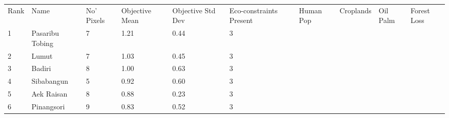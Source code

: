 \begin{table}[ht]
\centering
\begingroup\fontsize{9pt}{10pt}\selectfont
\begin{tabular}{C{0.05\textwidth}C{0.15\textwidth}C{0.08\textwidth}C{0.08\textwidth}C{0.08\textwidth}C{0.08\textwidth}C{0.08\textwidth}C{0.08\textwidth}C{0.08\textwidth}C{0.08\textwidth}}
 Rank & Name & No' Pixels & Objective Mean & Objective Std Dev & Eco-constraints  Present & Human Pop & Croplands & Oil Palm & Forest Loss \\ 
 {1} & Pasaribu Tobing &   7 & \textcolor[HTML]{FFFFFF}{1.21} & \textcolor[HTML]{000000}{0.44} & \textcolor[HTML]{FFFFFF}{3} &  &  &  &  \\ 
  {2} & Lumut &   7 & \textcolor[HTML]{FFFFFF}{1.03} & \textcolor[HTML]{FFFFFF}{0.45} & \textcolor[HTML]{FFFFFF}{3} &  &  &  &  \\ 
  {3} & Badiri &   8 & \textcolor[HTML]{FFFFFF}{1.00} & \textcolor[HTML]{FFFFFF}{0.63} & \textcolor[HTML]{FFFFFF}{3} &  &  &  &  \\ 
  {4} & Sibabangun &   5 & \textcolor[HTML]{FFFFFF}{0.92} & \textcolor[HTML]{FFFFFF}{0.60} & \textcolor[HTML]{FFFFFF}{3} &  &  &  &  \\ 
  {5} & Aek Raisan &   8 & \textcolor[HTML]{000000}{0.88} & \textcolor[HTML]{000000}{0.23} & \textcolor[HTML]{FFFFFF}{3} &  &  &  &  \\ 
  {6} & Pinangsori &   9 & \textcolor[HTML]{000000}{0.83} & \textcolor[HTML]{FFFFFF}{0.52} & \textcolor[HTML]{FFFFFF}{3} &  &  &  &  \\ 

\end{tabular}
\end{table}
